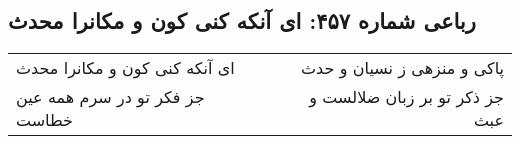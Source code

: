 \begin{center}
\section*{رباعی شماره ۴۵۷: ای آنکه کنی کون و مکانرا محدث}
\label{sec:0457}
\begin{longtable}{l p{0.5cm} r}
ای آنکه کنی کون و مکانرا محدث
&&
پاکی و منزهی ز نسیان و حدث
\\
جز فکر تو در سرم همه عین خطاست
&&
جز ذکر تو بر زبان ضلالست و عبث
\\
\end{longtable}
\end{center}
